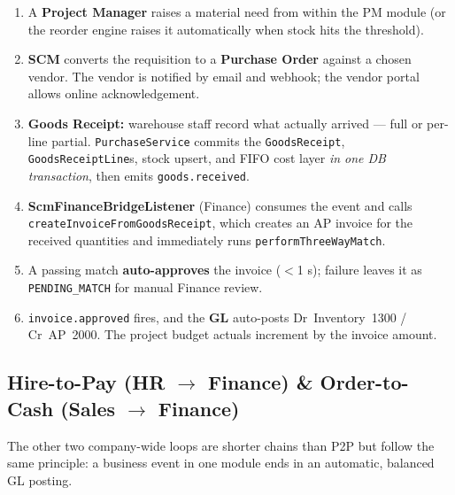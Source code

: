 \documentclass[11pt,a4paper]{article}
\newcommand{\code}[1]{\texttt{\small #1}}
\begin{document}
\begin{enumerate}
  \item A \textbf{Project Manager} raises a material need from within the PM module
  (or the reorder engine raises it automatically when stock hits the threshold).
  \item \textbf{SCM} converts the requisition to a \textbf{Purchase Order} against a
  chosen vendor. The vendor is notified by email and webhook; the vendor portal allows
  online acknowledgement.
  \item \textbf{Goods Receipt:} warehouse staff record what actually arrived --- full
  or per-line partial. \code{PurchaseService} commits the \code{GoodsReceipt},
  \code{GoodsReceiptLine}s, stock upsert, and FIFO cost layer \emph{in one DB
  transaction}, then emits \code{goods.received}.
  \item \textbf{ScmFinanceBridgeListener} (Finance) consumes the event and calls
  \code{createInvoiceFromGoodsReceipt}, which creates an AP invoice for the received
  quantities and immediately runs \code{performThreeWayMatch}.
  \item A passing match \textbf{auto-approves} the invoice ($<$1 s); failure leaves it
  as \code{PENDING\_MATCH} for manual Finance review.
  \item \code{invoice.approved} fires, and the \textbf{GL} auto-posts
  Dr~Inventory~1300 / Cr~AP~2000. The project budget actuals increment by the invoice
  amount.
\end{enumerate}

\subsection{Hire-to-Pay (HR $\rightarrow$ Finance) \& Order-to-Cash (Sales $\rightarrow$ Finance)}

The other two company-wide loops are shorter chains than P2P but follow the same
principle: a business event in one module ends in an automatic, balanced GL posting.
\end{document}
